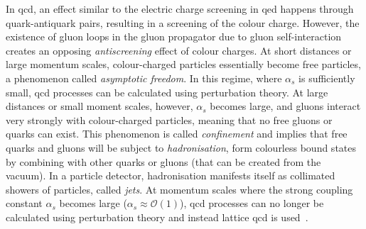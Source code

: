 In \gls{qcd}, an effect similar to the electric charge screening in \gls{qed} happens through quark-antiquark pairs, resulting in a screening of the colour charge. However, the existence of gluon loops in the gluon propagator due to gluon self-interaction creates an opposing \textit{antiscreening} effect of colour charges. At short distances or large momentum scales, colour-charged particles essentially become free particles, a phenomenon called \textit{asymptotic freedom}. In this regime, where $\alpha_s$ is sufficiently small, \gls{qcd} processes can be calculated using perturbation theory. At large distances or small moment scales, however, $\alpha_s$ becomes large, and gluons interact very strongly with colour-charged particles, meaning that no free gluons or quarks can exist. This phenomenon is called \textit{confinement} and implies that free quarks and gluons will be subject to \textit{hadronisation}, \ie form colourless bound states by combining with other quarks or gluons (that can be created from the vacuum). In a particle detector, hadronisation manifests itself as collimated showers of particles, called \textit{jets}. At momentum scales where the strong coupling constant $\alpha_s$ becomes large ($\alpha_s \approx \mathcal{O}(1)$), \gls{qcd} processes can no longer be calculated using perturbation theory and instead lattice \gls{qcd} is used~\cite{PhysRevD.10.2445,DeGrand:1055545}. 


